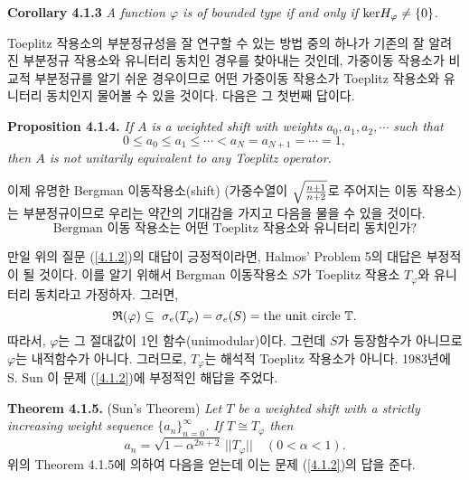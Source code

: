 \documentclass[12pt,a4paper,2sided]{article}
\begin{document}
\vspace{0.3cm} {\bf Corollary 4.1.3} {\sl  A function $\varphi$ is
of bounded type if and only if ${\rm ker}H_{\varphi}\neq\{0\}$. }

\vspace{0.3cm} Toeplitz 작용소의 부분정규성을 잘 연구할 수 있는 방법
중의 하나가 기존의 잘 알려진 부분정규 작용소와 유니터리 동치인
경우를 찾아내는 것인데, 가중이동 작용소가 비교적 부분정규를 알기
쉬운 경우이므로 어떤 가중이동 작용소가 Toeplitz 작용소와 유니터리
동치인지 물어볼 수 있을 것이다. 다음은 그 첫번째 답이다.


\newpage{} \vspace{0.8cm}

{\bf Proposition 4.1.4.} {\sl If $A$ is a weighted shift with
weights $a_0, a_1, a_2, \cdots $ such that
$$
0\le a_0 \le a_1 \le \cdots < a_N = a_{N+1}= \cdots = 1,
$$
then $A$ is not unitarily equivalent to any Toeplitz operator. }

\vspace{.2 cm} 이제 유명한 Bergman 이동작용소(shift) (가중수열이
$\sqrt{{n+1}\over{n+2}}$로 주어지는 이동 작용소)는 부분정규이므로
우리는 약간의 기대감을 가지고 다음을 물을 수 있을 것이다.
\begin{equation}\label{4.1.2}
\mbox{Bergman 이동 작용소는 어떤 Toeplitz 작용소와 유니터리
동치인가?}
\end{equation}

만일 위의 질문 (\ref{4.1.2})의 대답이 긍정적이라면, Halmos' Problem
5의 대답은 부정적이 될 것이다. 이를 알기 위해서 Bergman 이동작용소
$S$가 Toeplitz 작용소 $T_\varphi$와 유니터리 동치라고 가정하자.
그러면,
$$
\frak{R}(\varphi)\subseteq\ \sigma
_e(T_\varphi )=\sigma_e(S)=\mbox{the unit circle}\ \mathbb{T}.
$$
따라서, $\varphi$는 그 절대값이 1인 함수(unimodular)이다. 그런데
$S$가 등장함수가 아니므로 $\varphi$는 내적함수가 아니다. 그러므로,
$T_\varphi$는 해석적 Toeplitz 작용소가 아니다. 1983년에 S. Sun
\cite{Sun}이 문제 (\ref{4.1.2})에 부정적인 해답을 주었다. \vspace{.2
cm}

{\bf Theorem 4.1.5.} (Sun's Theorem) {\rm \cite{Sun}} {\sl Let $T$
be a weighted shift with a strictly increasing weight sequence
$\{a_{n}\}_{n=0}^{\infty}$. If $T\cong T_{\varphi}$ then
$$
a_{n}=\sqrt{1-{\alpha}^{2n+2}} \,||T_{\varphi}||\quad (0<\alpha <1).
$$}
\indent 위의 Theorem 4.1.5에 의하여 다음을 얻는데 이는 문제
(\ref{4.1.2})의 답을 준다. \vspace{.2 cm}
\end{document}
